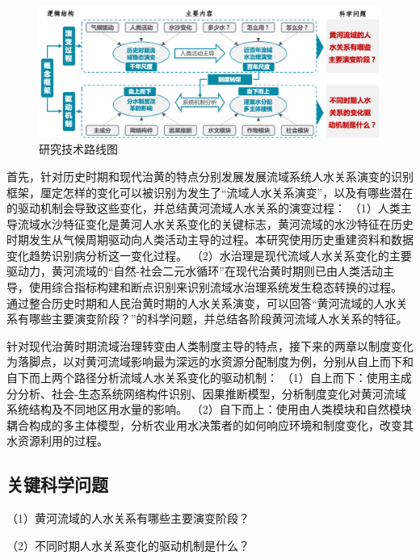 \begin{figure}[htb] %
    \includegraphics[width=\textwidth]{img/ch1/ch1_workflow.png}
    \caption{研究技术路线图}\label{ch1:fig:workflow}
\end{figure}

首先，针对历史时期和现代治黄的特点分别发展发展流域系统人水关系演变的识别框架，厘定怎样的变化可以被识别为发生了“流域人水关系演变”，以及有哪些潜在的驱动机制会导致这些变化，并总结黄河流域人水关系的演变过程：
（1）人类主导流域水沙特征变化是黄河人水关系变化的关键标志，黄河流域的水沙特征在历史时期发生从气候周期驱动向人类活动主导的过程。本研究使用历史重建资料和数据变化趋势识别病分析这一变化过程。
（2）水治理是现代流域人水关系变化的主要驱动力，黄河流域的“自然-社会二元水循环”在现代治黄时期则已由人类活动主导，使用综合指标构建和断点识别来识别流域水治理系统发生稳态转换的过程。
通过整合历史时期和人民治黄时期的人水关系演变，可以回答“黄河流域的人水关系有哪些主要演变阶段？”的科学问题，并总结各阶段黄河流域人水关系的特征。

针对现代治黄时期流域治理转变由人类制度主导的特点，接下来的两章以制度变化为落脚点，以对黄河流域影响最为深远的水资源分配制度为例，分别从自上而下和自下而上两个路径分析流域人水关系变化的驱动机制：
（1）自上而下：使用主成分分析、社会-生态系统网络构件识别、因果推断模型，分析制度变化对黄河流域系统结构及不同地区用水量的影响。
（2）自下而上：使用由人类模块和自然模块耦合构成的多主体模型，分析农业用水决策者的如何响应环境和制度变化，改变其水资源利用的过程。

\subsection{关键科学问题}

（1）黄河流域的人水关系有哪些主要演变阶段？

（2）不同时期人水关系变化的驱动机制是什么？
